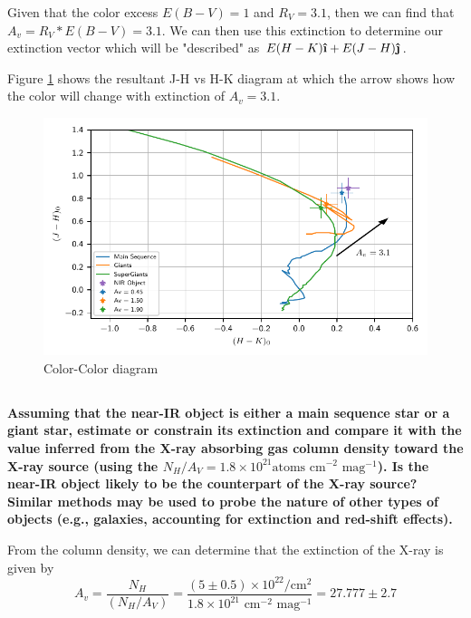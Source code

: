 Given that the color excess $E(B-V)=1$ and $R_V=3.1$, then we can find that $A_v = R_V * E(B-V) = 3.1$. 
We can then use this extinction to determine our extinction vector which will be "described" as $E(H-K)\uveci + E(J-H)\uvecj$.

Figure \ref{fig:ColorColorDiagram} shows the resultant J-H vs H-K diagram at which the arrow shows how the color will change with extinction of $A_v=3.1$. 

\begin{figure}
    \centering
    \includegraphics{CodeAndFigures/ASTRO643_HW4P4plot.pdf}
    \caption{Color-Color diagram}
    \label{fig:ColorColorDiagram}
\end{figure}

\subsection{}
\textbf{Assuming that the near-IR object is either a main sequence star or a giant star, estimate or constrain its extinction and compare it with the value inferred from the X-ray absorbing gas column density toward the X-ray source (using the $N_H/A_V = 1.8\times 10^{21} \text{atoms cm}^{-2} \text{ mag}^{-1}$).
Is the near-IR object likely to be the counterpart of the X-ray source?
Similar methods may be used to probe the nature of other types of objects (e.g., galaxies, accounting for extinction and red-shift effects).}

From the column density, we can determine that the extinction of the X-ray is given by 
\begin{equation*}
    A_v = \frac{N_H}{(N_H/A_V)} = \frac{(5\pm0.5)\times10^{22} \si{\per\cm\squared}}{1.8\times 10^{21} \text{ cm}^{-2} \text{ mag}^{-1}} = \num{27.777}\pm2.7 
\end{equation*}

